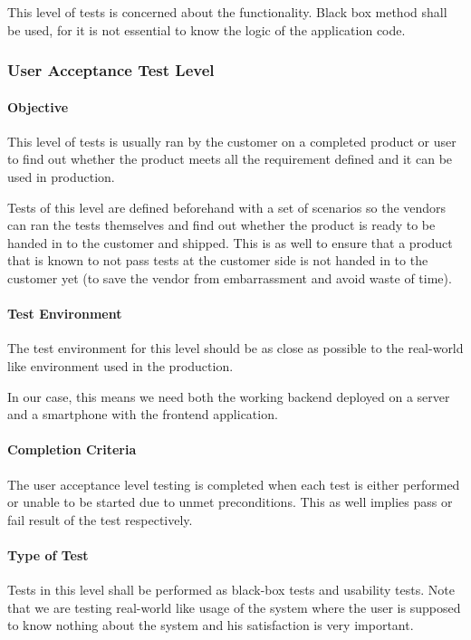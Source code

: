 \documentclass[11pt]{book}
\begin{document}
This level of tests is concerned about the functionality. Black box method shall be used, for it is not essential to know the logic of the application code. 


\subsubsection{User Acceptance Test Level}

\paragraph{Objective}

This level of tests is usually ran by the customer on a completed product or user to find out whether the product meets all the requirement defined and it can be used in production.

Tests of this level are defined beforehand with a set of scenarios so the vendors can ran the tests themselves and find out whether the product is ready to be handed in to the customer and shipped. This is as well to ensure that a product that is known to not pass tests at the customer side is not handed in to the customer yet (to save the vendor from embarrassment and avoid waste of time).

\paragraph{Test Environment}

The test environment for this level should be as close as possible to the real-world like environment used in the production.

In our case, this means we need both the working backend deployed on a server and a smartphone with the frontend application.


\paragraph{Completion Criteria}

The user acceptance level testing is completed when each test is either performed or unable to be started due to unmet preconditions. This as well implies pass or fail result of the test respectively.


\paragraph{Type of Test}

Tests in this level shall be performed as black-box tests and usability tests. Note that we are testing real-world like usage of the system where the user is supposed to know nothing about the system and his satisfaction is very important.
\end{document}
